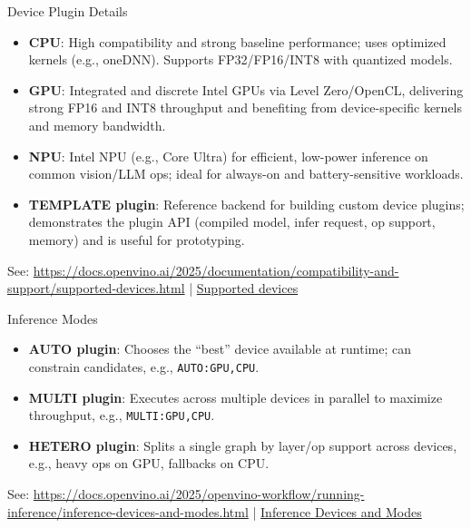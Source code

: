 \documentclass{beamer}
\begin{document}
\begin{frame}{Device Plugin Details}
  \begin{itemize}
    \item \textbf{CPU}: High compatibility and strong baseline performance; uses optimized kernels (e.g., oneDNN). Supports FP32/FP16/INT8 with quantized models.
    \item \textbf{GPU}: Integrated and discrete Intel GPUs via Level Zero/OpenCL, delivering strong FP16 and INT8 throughput and benefiting from device-specific kernels and memory bandwidth.
    \item \textbf{NPU}: Intel NPU (e.g., Core Ultra) for efficient, low-power inference on common vision/LLM ops; ideal for always-on and battery-sensitive workloads.
    \item \textbf{TEMPLATE plugin}: Reference backend for building custom device plugins; demonstrates the plugin API (compiled model, infer request, op support, memory) and is useful for prototyping.
  \end{itemize}
  \footnotesize See: \href{https://docs.openvino.ai/2025/documentation/compatibility-and-support/supported-devices.html}{https://docs.openvino.ai/2025/documentation/compatibility-and-support/supported-devices.html} \;\;|\;\; \href{https://docs.openvino.ai/2024/openvino_docs_OV_UG_supported_plugins_Supported_Devices.html}{Supported devices}
\end{frame}

\begin{frame}{Inference Modes}
  \begin{itemize}
    \item \textbf{AUTO plugin}: Chooses the “best” device available at runtime; can constrain candidates, e.g., \texttt{AUTO:GPU,CPU}.
    \item \textbf{MULTI plugin}: Executes across multiple devices in parallel to maximize throughput, e.g., \texttt{MULTI:GPU,CPU}.
    \item \textbf{HETERO plugin}: Splits a single graph by layer/op support across devices, e.g., heavy ops on GPU, fallbacks on CPU\@.
  \end{itemize}
  \footnotesize See: \href{https://docs.openvino.ai/2025/openvino-workflow/running-inference/inference-devices-and-modes.html}{https://docs.openvino.ai/2025/openvino-workflow/running-inference/inference-devices-and-modes.html} \;\;|\;\; \href{https://docs.openvino.ai/2024/openvino_docs_OV_UG_supported_plugins_Supported_Devices.html}{Inference Devices and Modes}
\end{frame}
\end{document}
